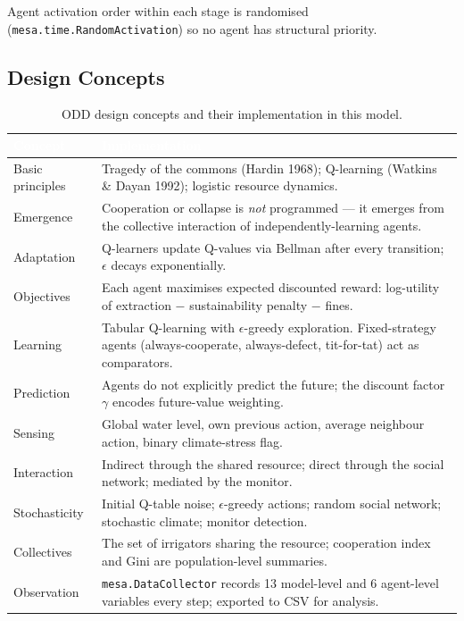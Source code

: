 \documentclass[12pt, a4paper]{article}
\begin{document}
Agent activation order within each stage is randomised
(\texttt{mesa.time.RandomActivation}) so no agent has structural priority.

\subsection{Design Concepts}

\begin{table}[H]
    \centering
    \renewcommand{\arraystretch}{1.3}
    \small
    \begin{tabular}{|l|p{10.5cm}|}
        \hline
        \rowcolor{nutDark}
        \textcolor{white}{\textbf{Concept}} & \textcolor{white}{\textbf{Implementation}} \\ \hline
        Basic principles & Tragedy of the commons (Hardin 1968); Q-learning (Watkins \& Dayan 1992); logistic resource dynamics. \\ \hline
        Emergence        & Cooperation or collapse is \emph{not} programmed --- it emerges from the collective interaction of independently-learning agents. \\ \hline
        Adaptation       & Q-learners update Q-values via Bellman after every transition; $\epsilon$ decays exponentially. \\ \hline
        Objectives       & Each agent maximises expected discounted reward: log-utility of extraction $-$ sustainability penalty $-$ fines. \\ \hline
        Learning         & Tabular Q-learning with $\epsilon$-greedy exploration. Fixed-strategy agents (always-cooperate, always-defect, tit-for-tat) act as comparators. \\ \hline
        Prediction       & Agents do not explicitly predict the future; the discount factor $\gamma$ encodes future-value weighting. \\ \hline
        Sensing          & Global water level, own previous action, average neighbour action, binary climate-stress flag. \\ \hline
        Interaction      & Indirect through the shared resource; direct through the social network; mediated by the monitor. \\ \hline
        Stochasticity    & Initial Q-table noise; $\epsilon$-greedy actions; random social network; stochastic climate; monitor detection. \\ \hline
        Collectives      & The set of irrigators sharing the resource; cooperation index and Gini are population-level summaries. \\ \hline
        Observation      & \texttt{mesa.DataCollector} records 13 model-level and 6 agent-level variables every step; exported to CSV for analysis. \\ \hline
    \end{tabular}
    \caption{ODD design concepts and their implementation in this model.}
\end{table}
\end{document}
